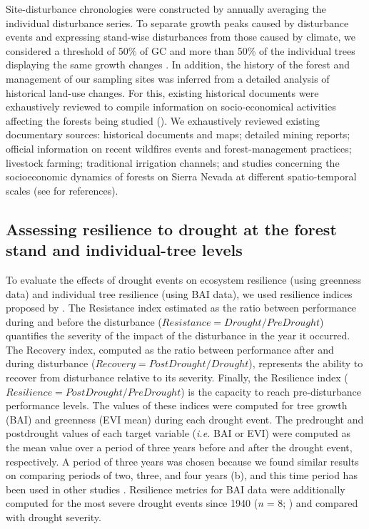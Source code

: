 Site-disturbance chronologies were constructed by annually averaging the individual disturbance series. To separate growth peaks caused by disturbance events and expressing stand-wise disturbances from those caused by climate, we considered a threshold of 50\% of GC and more than 50\% of the individual trees displaying the same growth changes \autocite[\emph{e.g.}][]{GeaIzquierdoCanellas2014LocalClimate}. In addition, the history of the forest and management of our sampling sites was inferred from a detailed analysis of historical land-use changes. For this, existing historical documents were exhaustively reviewed to compile information on socio-economical activities affecting the forests being studied (). We exhaustively reviewed existing documentary sources: historical documents and maps; detailed mining reports; official information on recent wildfires events and forest-management practices; livestock farming; traditional irrigation channels; and studies concerning the socioeconomic dynamics of forests on Sierra Nevada at different spatio-temporal scales (see  for references).

\subsection{Assessing resilience to drought at the forest stand and individual-tree levels}\label{sec:dendro:Resilience}
To evaluate the effects of drought events on ecosystem resilience (using greenness data) and individual tree resilience (using BAI data), we used resilience indices proposed by \textcite{Lloretetal2011ComponentsTree}. The Resistance index estimated as the ratio between performance during and before the disturbance (\(Resistance=Drought/PreDrought\)) quantifies the severity of the impact of the disturbance in the year it occurred. The Recovery index, computed as the ratio between performance after and during disturbance (\(Recovery= PostDrought/Drought\)), represents the ability to recover from disturbance relative to its severity. Finally, the Resilience index (\(Resilience = PostDrought/PreDrought\)) is the capacity to reach pre-disturbance performance levels. The values of these indices were computed for tree growth (BAI) and greenness (EVI mean) during each drought event. The predrought and postdrought values of each target variable (\emph{i.e.} BAI or EVI) were computed as the mean value over a period of three years before and after the drought event, respectively. A period of three years was chosen because we found similar results on comparing periods of two, three, and four years (b), and this time period has been used in other studies \autocite[\emph{e.g.}][]{Gazoletal2018ForestResilience}. Resilience metrics for BAI data were additionally computed for the most severe drought events since 1940 (\emph{n} = 8; ) and compared with drought severity.

